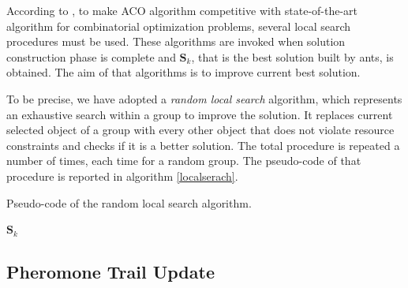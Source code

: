 \documentclass[12pt,a4paper]{report}
\begin{document}
According to \citet{acogrosso}, to make ACO algorithm competitive with  state-of-the-art algorithm for combinatorial optimization problems, several local search procedures must be used. These algorithms are invoked when solution construction phase is complete and $\textbf{S}_k$, that is the best solution built by ants, is obtained. The aim of that algorithms is to improve current best solution.

To be precise, we have adopted a \textit{random local search} algorithm, which represents an exhaustive search within a group to improve the solution. It replaces current selected object of a group with every other object that does not violate resource constraints and checks if it is a better solution. The total procedure is repeated a number of times, each time for a random group. The pseudo-code of that procedure is reported in algorithm \ref{localserach}.
	

\begin{algorithm}\label{localserach}
	\caption{Pseudo-code of the random local search algorithm.}
	
	\Return $\textbf{S}_k$
\end{algorithm}

\subsection{Pheromone Trail Update}
\end{document}
